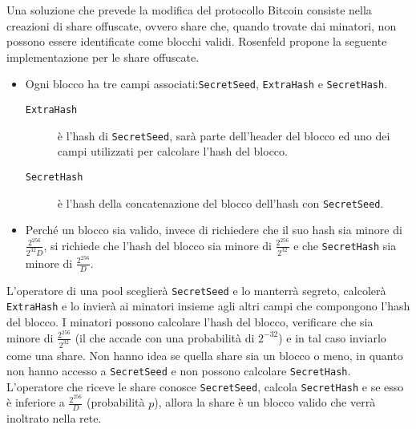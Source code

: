 Una soluzione che prevede la modifica del protocollo Bitcoin consiste nella creazioni di share offuscate, ovvero share che, quando trovate dai minatori, non possono essere identificate come blocchi validi.    Rosenfeld propone la seguente implementazione per le share offuscate.
\begin{itemize}
    \item Ogni blocco ha tre campi associati:\verb|SecretSeed|, \verb|ExtraHash| e \verb|SecretHash|.
      \begin{description}
          \item[\verb|ExtraHash|] è l'hash di \verb|SecretSeed|, sarà parte dell'header del blocco ed uno dei campi utilizzati per calcolare l'hash del blocco.
          \item[\verb|SecretHash|] è l'hash della concatenazione del blocco dell'hash con \verb|SecretSeed|.
      \end{description}
    \item Perché un blocco sia valido, invece di richiedere che il suo hash sia minore di $\frac{2^256}{2^32 D}$, si richiede che l'hash del blocco sia minore di $\frac{2^256}{2^32}$ e che \verb|SecretHash| sia minore di $\frac{2^256}{D}$.
\end{itemize}
L'operatore di una pool sceglierà \verb|SecretSeed| e lo manterrà segreto, calcolerà \verb|ExtraHash| e lo invierà ai minatori insieme agli altri campi che compongono l'hash del blocco. I minatori possono calcolare l'hash del blocco, verificare che sia minore di $\frac{2^256}{2^32}$ (il che accade con una probabilità di $2^{-32}$) e in tal caso inviarlo come una share. Non hanno idea se quella share sia un blocco o meno, in quanto non hanno accesso a \verb|SecretSeed| e non possono calcolare \verb|SecretHash|. L'operatore che riceve le share conosce \verb|SecretSeed|, calcola \verb|SecretHash| e se esso è inferiore a $\frac{2^256}{D}$ (probabilità $p$), allora la share è un blocco valido che verrà inoltrato nella rete.
